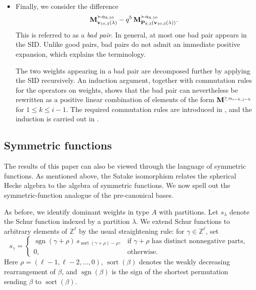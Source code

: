 \begin{itemize}
\item Finally, we consider the difference
\[
    \mathbf{M}_{\mathbf{v}_{10,3}(\lambda)}^{\succ \alpha_{8,10}}
    -q^5\,\mathbf{M}_{\mathbf{P}_{8,3}(\mathbf{v}_{10,3}(\lambda))}^{\succ \alpha_{8,10}}.
\]
This is referred to as a \emph{bad pair}.
In general, at most one bad pair appears in the SID. Unlike good pairs, bad pairs do not admit an immediate positive expansion, which explains the terminology.

The two weights appearing in a bad pair are decomposed further by applying the SID recursively.
An induction argument, together with commutation rules for the operators on weights, shows that the bad pair can nevertheless be rewritten as a positive linear combination of elements of the form $\mathbf{M}^{\succeq\alpha_{i-k,j-k}}$ for $1\leq k\leq i-1$. 
The required commutation rules are introduced in , and the induction is carried out in .
\end{itemize}

\subsection{Symmetric functions}

The results of this paper can also be viewed through the language of symmetric functions. As mentioned above, the Satake isomorphism relates the spherical Hecke algebra to the algebra of symmetric functions. We now spell out the symmetric-function analogue of the pre-canonical bases.

As before, we identify dominant weights in type $A$ with partitions. Let $s_\lambda$ denote the Schur function indexed by a partition $\lambda$. We extend Schur functions to arbitrary elements of $\mathbb{Z}^{\ell}$ by the usual straightening rule: for $\gamma\in\mathbb{Z}^{\ell}$, set
\begin{equation}\label{eq:straighten}
  s_\gamma =
  \begin{cases}
    \operatorname{sgn}(\gamma+\rho)\,
    s_{\operatorname{sort}(\gamma+\rho)-\rho},
      & \text{if $\gamma+\rho$ has distinct nonnegative parts,} \\[4pt]
    0, & \text{otherwise.}
  \end{cases}
\end{equation}
Here $\rho=(\ell-1,\ell-2,\dots,0)$, $\operatorname{sort}(\beta)$ denotes the weakly decreasing rearrangement of $\beta$, and $\operatorname{sgn}(\beta)$ is the sign of the shortest permutation sending $\beta$ to $\operatorname{sort}(\beta)$.

